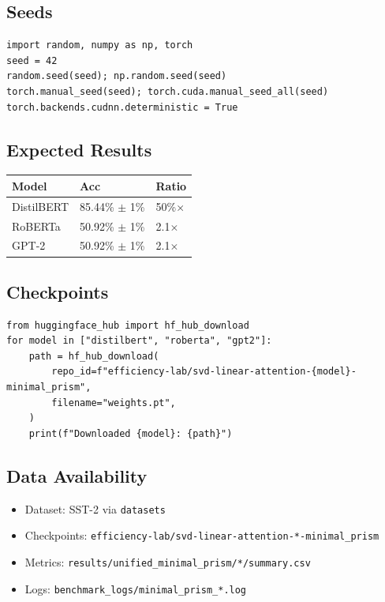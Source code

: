 \subsection{Seeds}

\begin{lstlisting}
import random, numpy as np, torch
seed = 42
random.seed(seed); np.random.seed(seed)
torch.manual_seed(seed); torch.cuda.manual_seed_all(seed)
torch.backends.cudnn.deterministic = True
\end{lstlisting}

\subsection{Expected Results}

\begin{table}[H]
\centering
\small
\begin{tabular}{lll}
\toprule
\textbf{Model} & \textbf{Acc} & \textbf{Ratio} \\
\midrule
DistilBERT & 85.44\% $\pm$ 1\% & 50\%$\times$ \\
RoBERTa & 50.92\% $\pm$ 1\% & 2.1$\times$ \\
GPT-2 & 50.92\% $\pm$ 1\% & 2.1$\times$ \\
\bottomrule
\end{tabular}
\end{table}

\subsection{Checkpoints}

\begin{lstlisting}
from huggingface_hub import hf_hub_download
for model in ["distilbert", "roberta", "gpt2"]:
    path = hf_hub_download(
        repo_id=f"efficiency-lab/svd-linear-attention-{model}-minimal_prism",
        filename="weights.pt",
    )
    print(f"Downloaded {model}: {path}")
\end{lstlisting}

\subsection{Data Availability}

\begin{itemize}
\item Dataset: SST-2 via \texttt{datasets}
\item Checkpoints: \texttt{efficiency-lab/svd-linear-attention-*-minimal\_prism}
\item Metrics: \texttt{results/unified\_minimal\_prism/*/summary.csv}
\item Logs: \texttt{benchmark\_logs/minimal\_prism\_*.log}

\end{itemize}
